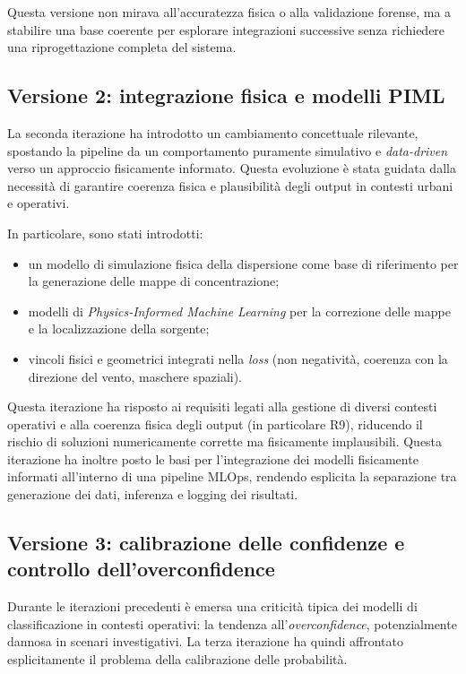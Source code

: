 Questa versione non mirava all’accuratezza fisica o alla validazione forense, ma a stabilire una base coerente per esplorare integrazioni successive senza richiedere una riprogettazione completa del sistema.

\subsection{Versione 2: integrazione fisica e modelli PIML}
\label{subsec:iter_v2}

La seconda iterazione ha introdotto un cambiamento concettuale rilevante, spostando la pipeline da un comportamento puramente simulativo e \textit{data-driven} verso un approccio fisicamente informato.
Questa evoluzione è stata guidata dalla necessità di garantire coerenza fisica e plausibilità degli output in contesti urbani e operativi.

In particolare, sono stati introdotti:
\begin{itemize}
    \item un modello di simulazione fisica della dispersione come base di riferimento per la generazione delle mappe di concentrazione;
    \item modelli di \emph{Physics-Informed Machine Learning} per la correzione delle mappe e la localizzazione della sorgente;
    \item vincoli fisici e geometrici integrati nella \emph{loss} (non negatività, coerenza con la direzione del vento, maschere spaziali).
\end{itemize}

Questa iterazione ha risposto ai requisiti legati alla gestione di diversi contesti operativi e alla coerenza fisica degli output (in particolare R9), riducendo il rischio di soluzioni numericamente corrette ma fisicamente implausibili.
Questa iterazione ha inoltre posto le basi per l’integrazione dei modelli fisicamente informati all’interno di una pipeline MLOps, rendendo esplicita la separazione tra generazione dei dati, inferenza e logging dei risultati.

\subsection{Versione 3: calibrazione delle confidenze e controllo dell’overconfidence}
\label{subsec:iter_v3}

Durante le iterazioni precedenti è emersa una criticità tipica dei modelli di classificazione in contesti operativi: la tendenza all’\emph{overconfidence}, potenzialmente dannosa in scenari investigativi.
La terza iterazione ha quindi affrontato esplicitamente il problema della calibrazione delle probabilità.

